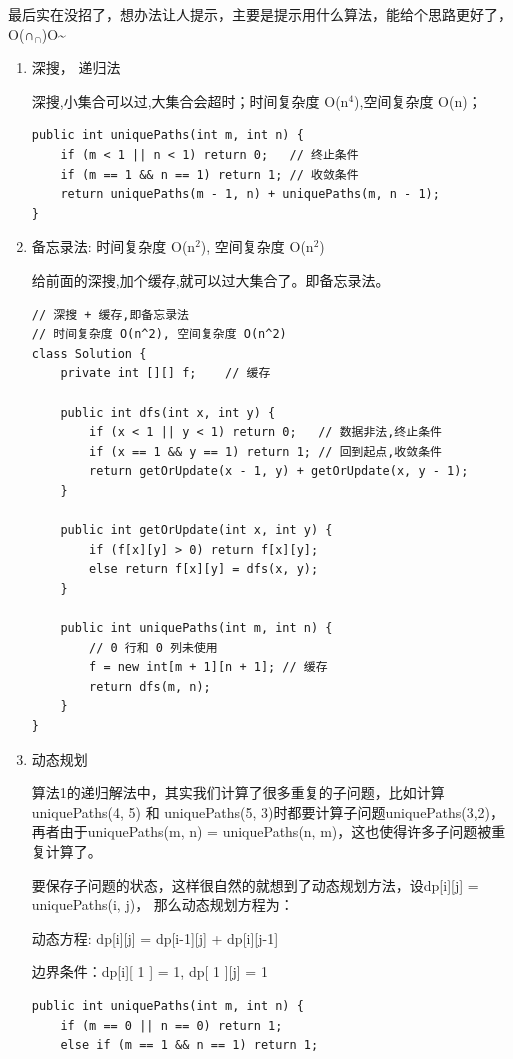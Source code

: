 \documentclass[12pt]{book}
\begin{document}
最后实在没招了，想办法让人提示，主要是提示用什么算法，能给个思路更好了，O(∩$_{\text{∩}}$)O\textasciitilde{}

\begin{enumerate}
\item 深搜， 递归法
\label{sec-14-2-1-1}

深搜,小集合可以过,大集合会超时；时间复杂度 O(n$^{\text{4}}$),空间复杂度 O(n)；
\lstset{language=java,label= ,caption= ,numbers=none}
\begin{lstlisting}
public int uniquePaths(int m, int n) {
    if (m < 1 || n < 1) return 0;   // 终止条件
    if (m == 1 && n == 1) return 1; // 收敛条件
    return uniquePaths(m - 1, n) + uniquePaths(m, n - 1);
}
\end{lstlisting}
\item 备忘录法: 时间复杂度 O(n$^{\text{2}}$), 空间复杂度 O(n$^{\text{2}}$)
\label{sec-14-2-1-2}

给前面的深搜,加个缓存,就可以过大集合了。即备忘录法。
\lstset{language=java,label= ,caption= ,numbers=none}
\begin{lstlisting}
// 深搜 + 缓存,即备忘录法
// 时间复杂度 O(n^2), 空间复杂度 O(n^2)
class Solution {
    private int [][] f;    // 缓存

    public int dfs(int x, int y) {
        if (x < 1 || y < 1) return 0;   // 数据非法,终止条件
        if (x == 1 && y == 1) return 1; // 回到起点,收敛条件
        return getOrUpdate(x - 1, y) + getOrUpdate(x, y - 1);
    }

    public int getOrUpdate(int x, int y) {
        if (f[x][y] > 0) return f[x][y];
        else return f[x][y] = dfs(x, y);
    }

    public int uniquePaths(int m, int n) {        
        // 0 行和 0 列未使用
        f = new int[m + 1][n + 1]; // 缓存
        return dfs(m, n);
    }
}
\end{lstlisting}
\item 动态规划
\label{sec-14-2-1-3}

算法1的递归解法中，其实我们计算了很多重复的子问题，比如计算uniquePaths(4, 5) 和 uniquePaths(5, 3)时都要计算子问题uniquePaths(3,2)，再者由于uniquePaths(m, n) = uniquePaths(n, m)，这也使得许多子问题被重复计算了。

要保存子问题的状态，这样很自然的就想到了动态规划方法，设dp[i][j] = uniquePaths(i, j)， 那么动态规划方程为：

动态方程: dp[i][j] = dp[i-1][j] + dp[i][j-1]

边界条件：dp[i][ 1 ] = 1, dp[ 1 ][j] = 1
\lstset{language=java,label= ,caption= ,numbers=none}
\begin{lstlisting}
public int uniquePaths(int m, int n) {
    if (m == 0 || n == 0) return 1;
    else if (m == 1 && n == 1) return 1;


\end{lstlisting}
\end{enumerate}
\end{document}
